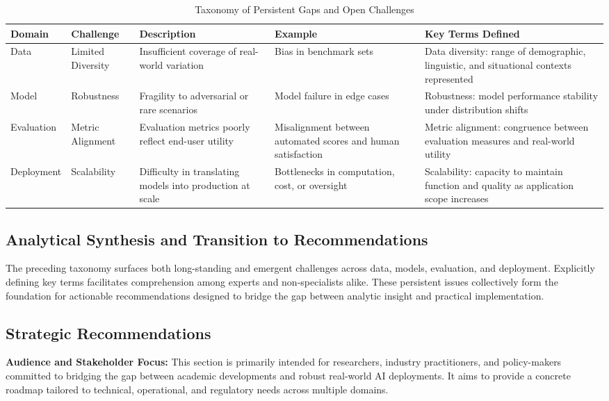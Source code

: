 \documentclass[sigconf]{acmart}
\begin{document}
\begin{table*}[htbp]
\centering
\caption{Taxonomy of Persistent Gaps and Open Challenges}
\label{tab:taxonomy-gaps}
\begin{adjustbox}{max width=\textwidth}
\begin{tabular}{@{}lllll@{}}
\toprule
Domain & Challenge & Description & Example & Key Terms Defined \\
\midrule
Data & Limited Diversity & Insufficient coverage of real-world variation & Bias in benchmark sets & Data diversity: range of demographic, linguistic, and situational contexts represented \\
Model & Robustness & Fragility to adversarial or rare scenarios & Model failure in edge cases & Robustness: model performance stability under distribution shifts \\
Evaluation & Metric Alignment & Evaluation metrics poorly reflect end-user utility & Misalignment between automated scores and human satisfaction & Metric alignment: congruence between evaluation measures and real-world utility \\
Deployment & Scalability & Difficulty in translating models into production at scale & Bottlenecks in computation, cost, or oversight & Scalability: capacity to maintain function and quality as application scope increases \\
\bottomrule
\end{tabular}
\end{adjustbox}
\end{table*}

\subsection{Analytical Synthesis and Transition to Recommendations}

The preceding taxonomy surfaces both long-standing and emergent challenges across data, models, evaluation, and deployment. Explicitly defining key terms facilitates comprehension among experts and non-specialists alike. These persistent issues collectively form the foundation for actionable recommendations designed to bridge the gap between analytic insight and practical implementation.

\subsection{Strategic Recommendations}

\noindent\textbf{Audience and Stakeholder Focus:} This section is primarily intended for researchers, industry practitioners, and policy-makers committed to bridging the gap between academic developments and robust real-world AI deployments. It aims to provide a concrete roadmap tailored to technical, operational, and regulatory needs across multiple domains.
\end{document}
